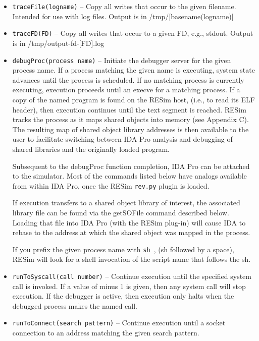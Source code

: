\documentclass[titlepage]{article}
\begin{document}
\begin{itemize}
\item {\tt traceFile(logname)} – Copy all writes that occur to the given filename.  Intended for use with log files.  Output is in /tmp/[basename(logname)]

\item {\tt traceFD(FD)} – Copy all writes that occur to a given FD, e.g., stdout.  Output is in /tmp/output-fd-[FD].log  

\item {\tt debugProc(process name)} – Initiate the debugger server for the given process name.  If a process matching the given name is executing, system state advances until the process is scheduled.  If no matching process is currently executing, execution proceeds until an execve for a matching process.   If a copy of the named program is found on the RESim host, (i.e., to read its ELF header), then execution continues until the text segment is reached.  RESim tracks the process as it maps shared objects into memory (see Appendix C).  The resulting map of shared object library addresses is then available to the user to facilitate switching between IDA Pro analysis and debugging of shared libraries and the originally loaded program.

Subsequent to the debugProc  function completion, IDA Pro can be attached to the simulator.  Most of the commands listed below have analogs available from within IDA Pro, once the RESim {\tt rev.py} plugin is loaded.

If execution transfers to a shared object library of interest, the associated library file can be found via the getSOFile command described below.  Loading that file into IDA Pro (with the RESim plug-in) will cause IDA to rebase to the address at which the shared object was mapped in the process.

If you prefix the given process name with {\tt sh }, (sh followed by a space), RESim will look for a shell invocation of the script name that follows the sh.

\item {\tt runToSyscall(call number)} – Continue execution until the specified system call is invoked.  If a value of minus 1 is given, then any system call will stop execution.  If the debugger is active, then execution only halts when the debugged process makes the named call.

\item {\tt runToConnect(search pattern)} – Continue execution until a socket connection to an address matching the given search pattern.


\end{itemize}
\end{document}

